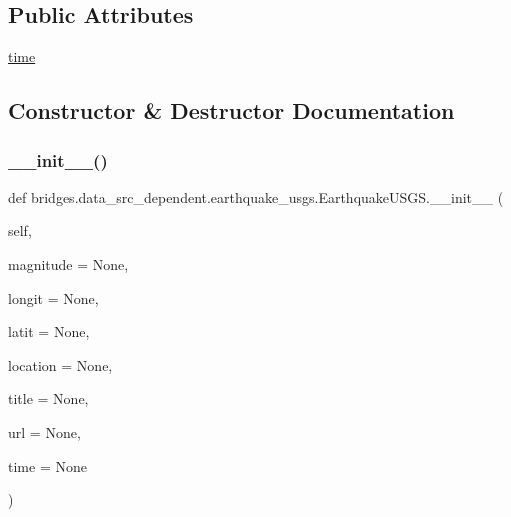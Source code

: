\subsection*{Public Attributes}
\begin{DoxyCompactItemize}
\item 
\mbox{\hyperlink{classbridges_1_1data__src__dependent_1_1earthquake__usgs_1_1_earthquake_u_s_g_s_aacc317fa18e83353df6c8ffb3d47d6c1}{time}}
\end{DoxyCompactItemize}


\subsection{Constructor \& Destructor Documentation}
\mbox{\label{classbridges_1_1data__src__dependent_1_1earthquake__usgs_1_1_earthquake_u_s_g_s_abddcbcfdc6985d7b95f3ce780b53b344}} 
\subsubsection{\texorpdfstring{\+\_\+\+\_\+init\+\_\+\+\_\+()}{\_\_init\_\_()}}
{\footnotesize\ttfamily def bridges.\+data\+\_\+src\+\_\+dependent.\+earthquake\+\_\+usgs.\+Earthquake\+U\+S\+G\+S.\+\_\+\+\_\+init\+\_\+\+\_\+ (\begin{DoxyParamCaption}\item[{}]{self,  }\item[{}]{magnitude = {\ttfamily None},  }\item[{}]{longit = {\ttfamily None},  }\item[{}]{latit = {\ttfamily None},  }\item[{}]{location = {\ttfamily None},  }\item[{}]{title = {\ttfamily None},  }\item[{}]{url = {\ttfamily None},  }\item[{}]{time = {\ttfamily None} }\end{DoxyParamCaption})}



